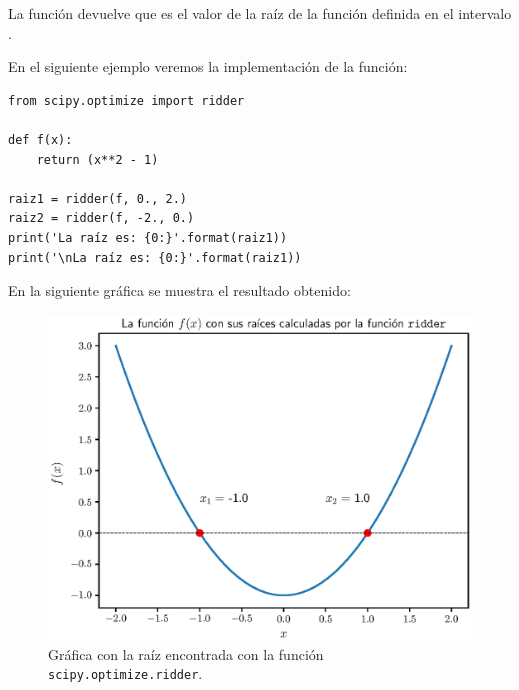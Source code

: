 La función  devuelve  que es el valor de la raíz de la función  definida en el intervalo \funcionazul{$[a, b]$}.
\par
En el siguiente ejemplo veremos la implementación de la función:

\begin{verbatim}
from scipy.optimize import ridder

def f(x):
    return (x**2 - 1)
    
raiz1 = ridder(f, 0., 2.)
raiz2 = ridder(f, -2., 0.)
print('La raíz es: {0:}'.format(raiz1))
print('\nLa raíz es: {0:}'.format(raiz1))
\end{verbatim}
En la siguiente gráfica se muestra el resultado obtenido:
\begin{figure}[H]
    \centering
    \includegraphics[scale=0.75]{Imagenes/plot_Metodo_Ridder_Ejercicio_03_01.eps}
    \caption{Gráfica con la raíz encontrada con la función \texttt{scipy.optimize.ridder}.}
    \label{fig:figura_06}
\end{figure}
